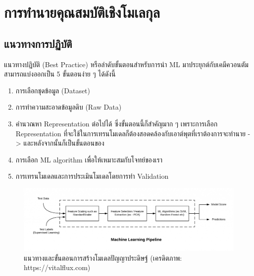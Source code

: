 

\chapter{การทำนายคุณสมบัติเชิงโมเลกุล}
\label{ch:predict_molprop}

\section{แนวทางการปฏิบัติ}

แนวทางปฏิบัติ (Best Practice) หรือลำดับขั้นตอนสำหรับการนำ ML มาประยุกต์กับเคมีควอนตัมสามารถแบ่งออกเป็น 5 ขั้นตอนง่าย ๆ ได้ดังนี้

\begin{enumerate}
    \item การเลือกชุดข้อมูล (Dataset)
    \item การทำความสะอาดข้อมูลดิบ (Raw Data)
    \item คำนวณหา Representation ต่อไปได้ ซึ่งขั้นตอนนี้ก็สำคัญมาก ๆ เพราะการเลือก Representation 
    ที่จะใช้ในการเทรนโมเดลก็ต้องสอดคล้องกับเอาต์พุตที่เราต้องการจะทำนาย -> และหลังจากนั้นก็เป็นขั้นตอนของ
    \item การเลือก ML algorithm เพื่อให้เหมาะสมกับโจทย์ของเรา 
    \item การเทรนโมเดลและการประเมินโมเดลโดยการทำ Validation
\end{enumerate}

\begin{figure}[H]
    \centering
    \includegraphics[width=0.9\linewidth]{fig/ml_pipeline.png}
    \caption{แนวทางและขั้นตอนการสร้างโมเดลปัญญาประดิษฐ์ (เครดิตภาพ: https://vitalflux.com)}
    \label{fig:ml_pipeline}
\end{figure}

